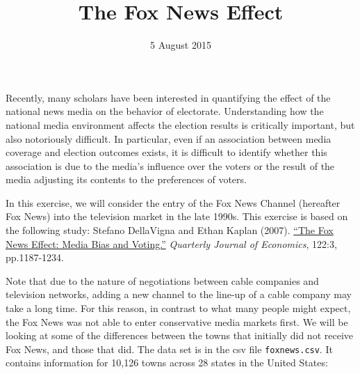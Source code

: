 \documentclass[]{article}
\title{The Fox News Effect}
\author{}
\date{5 August 2015}
\begin{document}
\maketitle


Recently, many scholars have been interested in quantifying the effect
of the national news media on the behavior of electorate. Understanding
how the national media environment affects the election results is
critically important, but also notoriously difficult. In particular,
even if an association between media coverage and election outcomes
exists, it is difficult to identify whether this association is due to
the media's influence over the voters or the result of the media
adjusting its contents to the preferences of voters.

In this exercise, we will consider the entry of the Fox News Channel
(hereafter Fox News) into the television market in the late 1990s. This
exercise is based on the following study: Stefano DellaVigna and Ethan
Kaplan (2007). \href{https://doi.org/10.1162/qjec.122.3.1187}{``The Fox
News Effect: Media Bias and Voting.''} \emph{Quarterly Journal of
Economics}, 122:3, pp.1187-1234.

Note that due to the nature of negotiations between cable companies and
television networks, adding a new channel to the line-up of a cable
company may take a long time. For this reason, in contrast to what many
people might expect, the Fox News was not able to enter conservative
media markets first. We will be looking at some of the differences
between the towns that initially did not receive Fox News, and those
that did. The data set is in the csv file \texttt{foxnews.csv}. It
contains information for 10,126 towns across 28 states in the United
States:
\end{document}
